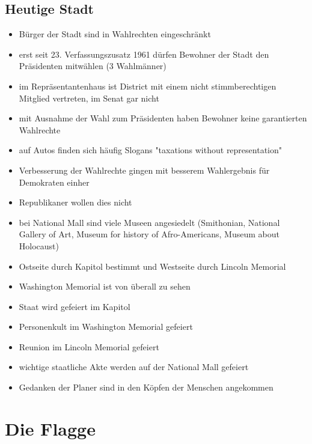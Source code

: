 \documentclass[10pt,a4paper,oneside,ngerman,numbers=noenddot]{scrartcl}
\newenvironment{myitemize}{\begin{itemize}\itemsep -8pt}{\end{itemize}} %
\begin{document}
\subsection*{Heutige Stadt}
\begin{myitemize}
    \item Bürger der Stadt sind in Wahlrechten eingeschränkt
    \item erst seit 23. Verfassungszusatz 1961 dürfen Bewohner der Stadt
          den Präsidenten mitwählen (3 Wahlmänner)
    \item im Repräsentantenhaus ist District mit einem nicht stimmberechtigen
          Mitglied vertreten, im Senat gar nicht
    \item mit Ausnahme der Wahl zum Präsidenten haben Bewohner keine garantierten
          Wahlrechte
    \item auf Autos finden sich häufig Slogans "taxations without representation"
    \item Verbesserung der Wahlrechte gingen mit besserem Wahlergebnis für Demokraten einher
    \item Republikaner wollen dies nicht
    \item bei National Mall sind viele Museen angesiedelt (Smithonian, National Gallery of Art, Museum for history of Afro-Americans, Museum about Holocaust)
    \item Ostseite durch Kapitol bestimmt und Westseite durch Lincoln Memorial
    \item Washington Memorial ist von überall zu sehen
    \item Staat wird gefeiert im Kapitol
    \item Personenkult im Washington Memorial gefeiert
    \item Reunion im Lincoln Memorial gefeiert 
    \item wichtige staatliche Akte werden auf der National Mall gefeiert
    \item Gedanken der Planer sind in den Köpfen der Menschen angekommen
\end{myitemize}

\section*{Die Flagge}
\end{document}
